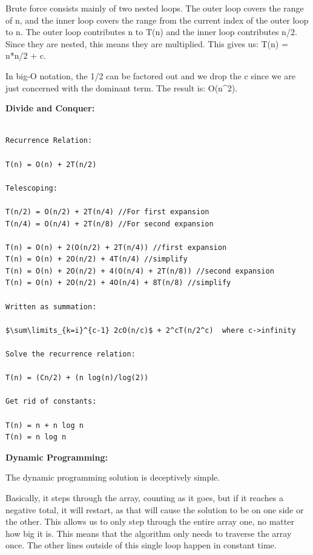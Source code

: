 \documentclass[letterpaper,10pt,titlepage,fleqn]{article}
\begin{document}

Brute force consists mainly of two nested loops. The outer loop covers the range of n, and the inner loop covers the range from the current index of the outer loop to n. The outer loop contributes n to T(n) and the inner loop contributes n/2. Since they are nested, this means they are multiplied. This gives us: T(n) = n*n/2 + c.

In big-O notation, the 1/2 can be factored out and we drop the c since we are just concerned with the dominant term. The result is: O(n^2).

\begin{centering}
\textbf{Divide and Conquer:}
\end{centering}


\begin{lstlisting}

Recurrence Relation:

T(n) = O(n) + 2T(n/2)

Telescoping:

T(n/2) = O(n/2) + 2T(n/4) //For first expansion
T(n/4) = O(n/4) + 2T(n/8) //For second expansion

T(n) = O(n) + 2(O(n/2) + 2T(n/4)) //first expansion
T(n) = O(n) + 2O(n/2) + 4T(n/4) //simplify
T(n) = O(n) + 2O(n/2) + 4(O(n/4) + 2T(n/8)) //second expansion
T(n) = O(n) + 2O(n/2) + 4O(n/4) + 8T(n/8) //simplify

Written as summation:

$\sum\limits_{k=i}^{c-1} 2cO(n/c)$ + 2^cT(n/2^c)  where c->infinity

Solve the recurrence relation:

T(n) = (Cn/2) + (n log(n)/log(2))

Get rid of constants:

T(n) = n + n log n
T(n) = n log n

\end{lstlisting}

\begin{centering}
\textbf{Dynamic Programming:}
\end{centering}


The dynamic programming solution is deceptively simple.

Basically, it steps through the array, counting as it goes, but if it reaches a negative total, it will restart, as that will cause the solution to be on one side or the other.
This allows us to only step through the entire array one, no matter how big it is. This means that the algorithm only needs to traverse the array once. The other lines outside of this single loop happen in constant time. 
\end{document}
